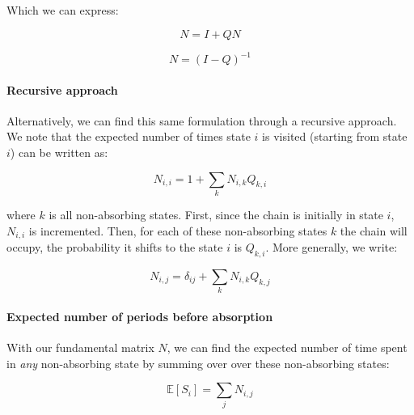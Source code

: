 \documentclass[11pt]{article}
\newcommand{\E}{\mathbb{E}}
\begin{document}
Which we can express: 

$$
N = I + QN
$$

$$
N = (I - Q)^{-1}
$$

\paragraph{Recursive approach} 

Alternatively, we can find this same formulation through a recursive approach.
We note that the expected number of times state $i$ is visited (starting from
state $i$) can be written as:

$$
N_{i,i} = 1 + \sum_k N_{i,k} Q_{k,i}
$$

where $k$ is all non-absorbing states. First, since the chain is initially in
state $i$, $N_{i,i}$ is incremented. Then, for each of these non-absorbing
states $k$ the chain will occupy, the probability it shifts to the state $i$ is
$Q_{k,i}$. More generally, we write:

$$
N_{i,j} = \delta_{ij} + \sum_k N_{i,k} Q_{k,j}
$$

\paragraph{Expected number of periods before absorption} 

With our fundamental matrix $N$, we can find the expected number of time spent
in \emph{any} non-absorbing state by summing over over these non-absorbing states:

$$
\E[S_i] = \sum_j N_{i,j}
$$




\printbibliography
\end{document}
